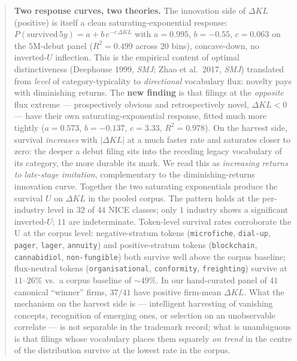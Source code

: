 \documentclass[11pt]{article}
\begin{document}
\begin{abstract}
\textbf{Two response curves, two theories.} The innovation side of
$\Delta KL$ (positive) is itself a clean saturating-exponential
response: $P(\text{survived}\,5y) = a + b\,e^{-c\,\Delta KL}$ with
$a = 0.995$, $b = -0.55$, $c = 0.063$ on the $5$M-debut panel ($R^2 =
0.499$ across $20$ bins), concave-down, no inverted-$U$ inflection.
This is the empirical content of optimal distinctiveness
(Deephouse 1999, \emph{SMJ}; Zhao et al.\ 2017, \emph{SMJ}) translated
from \emph{level} of category-typicality to \emph{directional}
vocabulary flux: novelty pays with diminishing returns. The
\textbf{new finding} is that filings at the \emph{opposite} flux
extreme --- prospectively obvious and retrospectively novel,
$\Delta KL < 0$ --- have their own saturating-exponential response,
fitted much more tightly ($a = 0.573$, $b = -0.137$, $c = 3.33$,
$R^2 = 0.978$). On the harvest side, survival \emph{increases} with
$|\Delta KL|$ at a much faster rate and saturates closer to zero:
the deeper a debut filing sits into the receding legacy vocabulary
of its category, the more durable its mark. We read this as
\emph{increasing returns to late-stage imitation}, complementary to
the diminishing-returns innovation curve. Together the two
saturating exponentials produce the survival $U$ on $\Delta KL$ in
the pooled corpus. The pattern holds at the per-industry level in
$32$ of $44$ NICE classes; only $1$ industry shows a significant
inverted-$U$; $11$ are indeterminate. Token-level survival rates
corroborate the U at the corpus level: negative-stratum tokens
(\texttt{microfiche}, \texttt{dial-up}, \texttt{pager},
\texttt{lager}, \texttt{annuity}) and positive-stratum tokens
(\texttt{blockchain}, \texttt{cannabidiol}, \texttt{non-fungible})
both survive well above the corpus baseline; flux-neutral tokens
(\texttt{organisational}, \texttt{conformity}, \texttt{freighting})
survive at $11$--$26\%$ vs.\ a corpus baseline of $\sim 49\%$. In
our hand-curated panel of $41$ canonical ``winner'' firms,
$37/41$ have positive firm-mean $\Delta KL$. What the mechanism on
the harvest side is --- intelligent harvesting of vanishing
concepts, recognition of emerging ones, or selection on an
unobservable correlate --- is not separable in the trademark record;
what is unambiguous is that filings whose vocabulary places them
squarely \emph{on trend} in the centre of the distribution survive at
the lowest rate in the corpus.


\end{abstract}
\end{document}
